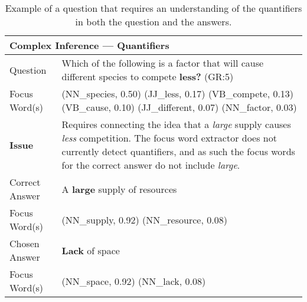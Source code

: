 \begin{table}[]
\caption{{  Example of a question that requires an understanding of the quantifiers in both the question and the answers. }} 
\begin{footnotesize}
\begin{tabularx}{\textwidth}{p{2.5cm}p{10cm}}
\hline
\multicolumn{2}{l}{Complex Inference --- Quantifiers} \\
\hline
Question 		& Which of the following is a factor that will cause different species to compete {\bf less?} (GR:5)  \\
Focus Word(s) 	& (NN\_species, 0.50) (JJ\_less, 0.17) (VB\_compete, 0.13) (VB\_cause, 0.10) (JJ\_different, 0.07) (NN\_factor, 0.03)\\
\textbf{Issue}			&  Requires connecting the idea that a \emph{large} supply causes \emph{less} competition.  The focus word extractor does not currently detect quantifiers, and as such the focus words for the correct answer do not include \emph{large}. \\
\hline
Correct Answer 	&  A {\bf large} supply of resources\\
Focus Word(s) 	&  (NN\_supply, 0.92) (NN\_resource, 0.08)\\
\hline
Chosen Answer & {\bf Lack} of space \\
Focus Word(s) &  (NN\_space, 0.92) (NN\_lack, 0.08)\\
\hline
\end{tabularx}
\end{footnotesize}
\label{ex:quantifiers}
\end{table}

 
